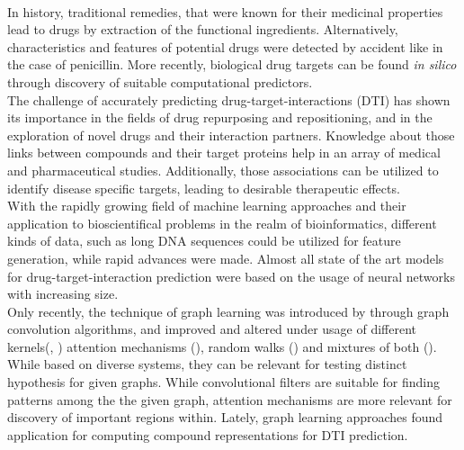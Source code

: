 \documentclass{bioinfo}
\begin{document}
\cite{Survey2018}\\
In history, traditional remedies, that were known for their medicinal properties lead to drugs by extraction of the functional ingredients. Alternatively, characteristics and features of potential drugs were detected by accident like in the case of penicillin. More recently, biological drug targets can be found \textit{in silico} through discovery of suitable computational predictors.\\
The challenge of accurately predicting drug-target-interactions (DTI) has shown its importance in the fields of drug repurposing and repositioning, and in the exploration of novel drugs and their interaction partners. Knowledge about those links between compounds and their target proteins help in an array of medical and pharmaceutical studies. Additionally, those associations can be utilized to identify disease specific targets, leading to desirable therapeutic effects.\\
With the rapidly growing field of machine learning approaches and their application to bioscientifical problems in the realm of bioinformatics, different kinds of data, such as long DNA sequences could be utilized for feature generation, while rapid advances were made. Almost all state of the art models for drug-target-interaction prediction were based on the usage of neural networks with increasing size.\\
Only recently, the technique of graph learning was introduced by \citet{GCNConv} through graph convolution algorithms, and improved and altered under usage of different kernels(\cite{ChebConv}, \cite{ARMAConv}) attention mechanisms (\cite{GATConv}), random walks (\cite{APPNPConv}) and mixtures of both (\cite{SAGEConv}). While based on diverse systems, they can be relevant for testing distinct hypothesis for given graphs. While convolutional filters are suitable for finding patterns among the the given graph, attention mechanisms are more relevant for discovery of important regions within. Lately, graph learning approaches found application for computing compound representations for DTI prediction.\\
\end{document}
